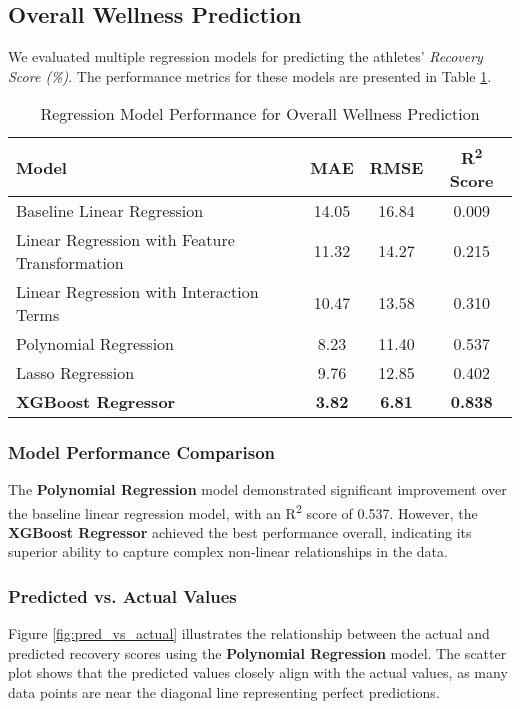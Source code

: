 \documentclass[manuscript,acmsmall,review,screen,authorversion=true]{acmart}
\begin{document}
\subsection{Overall Wellness Prediction}

We evaluated multiple regression models for predicting the athletes' \textit{Recovery Score (\%)}. The performance metrics for these models are presented in Table \ref{tab:regression_results}.

\begin{table}[h]
\caption{Regression Model Performance for Overall Wellness Prediction}
\label{tab:regression_results}
\centering
\begin{tabular}{lccc}
\hline
\textbf{Model} & \textbf{MAE} & \textbf{RMSE} & \textbf{R\textsuperscript{2} Score} \\
\hline
Baseline Linear Regression & 14.05 & 16.84 & 0.009 \\
Linear Regression with Feature Transformation & 11.32 & 14.27 & 0.215 \\
Linear Regression with Interaction Terms & 10.47 & 13.58 & 0.310 \\
Polynomial Regression & 8.23 & 11.40 & 0.537 \\
Lasso Regression & 9.76 & 12.85 & 0.402 \\
\textbf{XGBoost Regressor} & \textbf{3.82} & \textbf{6.81} & \textbf{0.838} \\
\hline
\end{tabular}
\end{table}

\subsubsection{Model Performance Comparison}

The \textbf{Polynomial Regression} model demonstrated significant improvement over the baseline linear regression model, with an R\textsuperscript{2} score of 0.537. However, the \textbf{XGBoost Regressor} achieved the best performance overall, indicating its superior ability to capture complex non-linear relationships in the data.

\subsubsection{Predicted vs. Actual Values}

Figure \ref{fig:pred_vs_actual} illustrates the relationship between the actual and predicted recovery scores using the \textbf{Polynomial Regression} model. The scatter plot shows that the predicted values closely align with the actual values, as many data points are near the diagonal line representing perfect predictions.
\end{document}
